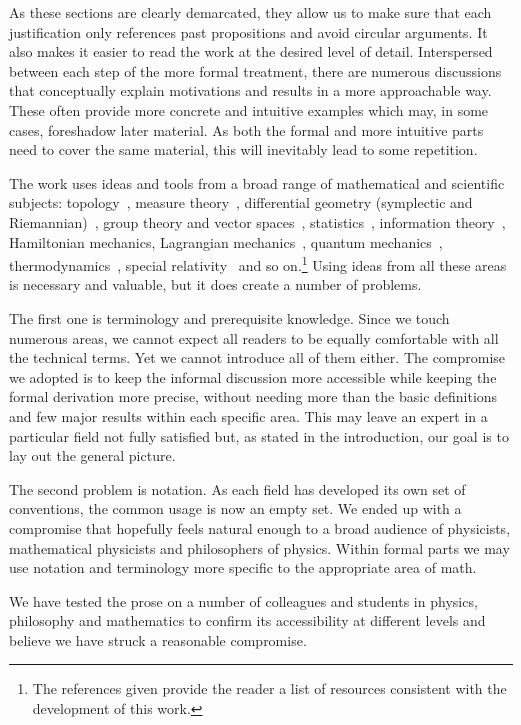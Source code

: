 \documentclass[smallextended]{svjour3}
\numberwithin{equation}{section}
\theoremstyle{definition}
\begin{document}
As these sections are clearly demarcated, they allow us to make sure that each justification only references past propositions and avoid circular arguments. It also makes it easier to read the work at the desired level of detail. Interspersed between each step of the more formal treatment, there are numerous discussions that conceptually explain motivations and results in a more approachable way. These often provide more concrete and intuitive examples which may, in some cases, foreshadow later material. As both the formal and more intuitive parts need to cover the same material, this will inevitably lead to some repetition.

The work uses ideas and tools from a broad range of mathematical and scientific subjects: topology~\cite{LeeTM}, measure theory~\cite{Halmos}, differential geometry (symplectic and Riemannian)~\cite{Lee}, group theory and vector spaces~\cite{Lang,Young}, statistics~\cite{Grimmet}, information theory~\cite{Pierce}, Hamiltonian mechanics, Lagrangian mechanics~\cite{classical_dynamics}, quantum mechanics~\cite{Landau,Weinberg}, thermodynamics~\cite{Van Ness}, special relativity~\cite{French} and so on.\footnote{The references given provide the reader a list of resources consistent with the development of this work.} Using ideas from all these areas is necessary and valuable, but it does create a number of problems.

The first one is terminology and prerequisite knowledge. Since we touch numerous areas, we cannot expect all readers to be equally comfortable with all the technical terms. Yet we cannot introduce all of them either. The compromise we adopted is to keep the informal discussion more accessible while keeping the formal derivation more precise, without needing more than the basic definitions and few major results within each specific area. This may leave an expert in a particular field not fully satisfied but, as stated in the introduction, our goal is to lay out the general picture.

The second problem is notation. As each field has developed its own set of conventions, the common usage is now an empty set. We ended up with a compromise that hopefully feels natural enough to a broad audience of physicists, mathematical physicists and philosophers of physics. Within formal parts we may use notation and terminology more specific to the appropriate area of math.

We have tested the prose on a number of colleagues and students in physics, philosophy and mathematics to confirm its accessibility at different levels and believe we have struck a reasonable compromise.
\end{document}
